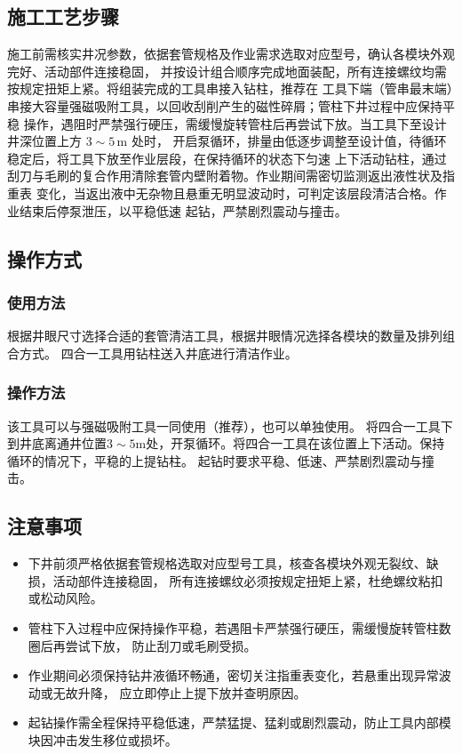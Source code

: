 \subsection{施工工艺步骤}

施工前需核实井况参数，依据套管规格及作业需求选取对应型号，确认各模块外观完好、活动部件连接稳固，
并按设计组合顺序完成地面装配，所有连接螺纹均需按规定扭矩上紧。将组装完成的工具串接入钻柱，推荐在
工具下端（管串最末端）串接大容量强磁吸附工具，以回收刮削产生的磁性碎屑；管柱下井过程中应保持平稳
操作，遇阻时严禁强行硬压，需缓慢旋转管柱后再尝试下放。当工具下至设计井深位置上方 $3\sim5$\,m 处时，
开启泵循环，排量由低逐步调整至设计值，待循环稳定后，将工具下放至作业层段，在保持循环的状态下匀速
上下活动钻柱，通过刮刀与毛刷的复合作用清除套管内壁附着物。作业期间需密切监测返出液性状及指重表
变化，当返出液中无杂物且悬重无明显波动时，可判定该层段清洁合格。作业结束后停泵泄压，以平稳低速
起钻，严禁剧烈震动与撞击。

\subsection{操作方式}
\subsubsection{使用方法}
根据井眼尺寸选择合适的套管清洁工具，根据井眼情况选择各模块的数量及排列组合方式。
四合一工具用钻柱送入井底进行清洁作业。
\subsubsection{操作方法}
该工具可以与强磁吸附工具一同使用（推荐），也可以单独使用。
将四合一工具下到井底离通井位置$3\sim 5\mathrm{m}$处，开泵循环。将四合一工具在该位置上下活动。保持循环的情况下，平稳的上提钻柱。
起钻时要求平稳、低速、严禁剧烈震动与撞击。

\subsection{注意事项}

\begin{itemize}
	\item 下井前须严格依据套管规格选取对应型号工具，核查各模块外观无裂纹、缺损，活动部件连接稳固，
	所有连接螺纹必须按规定扭矩上紧，杜绝螺纹粘扣或松动风险。
	\item 管柱下入过程中应保持操作平稳，若遇阻卡严禁强行硬压，需缓慢旋转管柱数圈后再尝试下放，
	防止刮刀或毛刷受损。
	\item 作业期间必须保持钻井液循环畅通，密切关注指重表变化，若悬重出现异常波动或无故升降，
	应立即停止上提下放并查明原因。
	\item 起钻操作需全程保持平稳低速，严禁猛提、猛刹或剧烈震动，防止工具内部模块因冲击发生移位或损坏。
\end{itemize}

